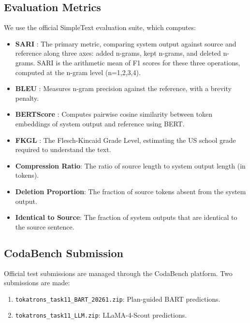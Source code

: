 \documentclass{ceurart}
\begin{document}
\subsection{Evaluation Metrics}

We use the official SimpleText evaluation suite, which computes:

\begin{itemize}
    \item \textbf{SARI} \cite{sari2016}: The primary metric, comparing system output against source and reference along three axes: added n-grams, kept n-grams, and deleted n-grams. SARI is the arithmetic mean of F1 scores for these three operations, computed at the n-gram level (n=1,2,3,4).
    \item \textbf{BLEU} \cite{bleu2002}: Measures n-gram precision against the reference, with a brevity penalty.
    \item \textbf{BERTScore} \cite{bertscore2020}: Computes pairwise cosine similarity between token embeddings of system output and reference using BERT.
    \item \textbf{FKGL} \cite{kincaid1975}: The Flesch-Kincaid Grade Level, estimating the US school grade required to understand the text.
    \item \textbf{Compression Ratio}: The ratio of source length to system output length (in tokens).
    \item \textbf{Deletion Proportion}: The fraction of source tokens absent from the system output.
    \item \textbf{Identical to Source}: The fraction of system outputs that are identical to the source sentence.
\end{itemize}

\subsection{CodaBench Submission}

Official test submissions are managed through the CodaBench platform.
Two submissions are made:

\begin{enumerate}
    \item \texttt{tokatrons\_task11\_BART\_20261.zip}: Plan-guided BART predictions.
    \item \texttt{tokatrons\_task11\_LLM.zip}: LLaMA-4-Scout predictions.
\end{enumerate}

\end{document}
